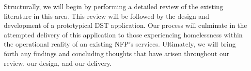 Structurally, we will begin by performing a detailed review of the existing literature in this area. This review will be followed by the design and development of a prototypical DST application. Our process will culminate in the attempted delivery of this application to those experiencing homelessness within the operational reality of an existing NFP's services. Ultimately, we will bring forth any findings and concluding thoughts that have arisen throughout our review, our design, and our delivery.